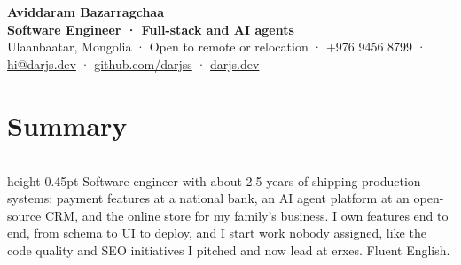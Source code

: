 \documentclass[9.5pt,letterpaper]{article}
\newcommand{\cvsection}[1]{\section*{#1}\vspace{3pt}\hrule height 0.45pt\vspace{3pt}}
\begin{document}
{\centering
  {\fontsize{18}{19}\selectfont\textbf{Aviddaram Bazarragchaa}}\\[0pt]
  \textbf{Software Engineer · Full-stack and AI agents}\\[2pt]
  Ulaanbaatar, Mongolia · Open to remote or relocation · +976 9456 8799 · \href{mailto:hi@darjs.dev}{hi@darjs.dev} · \href{https://github.com/darjss}{github.com/darjss} · \href{https://darjs.dev}{darjs.dev}
\par}


\cvsection{Summary}
Software engineer with about 2.5 years of shipping production systems: payment features at a national bank, an AI agent platform at an open-source CRM, and the online store for my family's business. I own features end to end, from schema to UI to deploy, and I start work nobody assigned, like the code quality and SEO initiatives I pitched and now lead at erxes. Fluent English.
\end{document}
